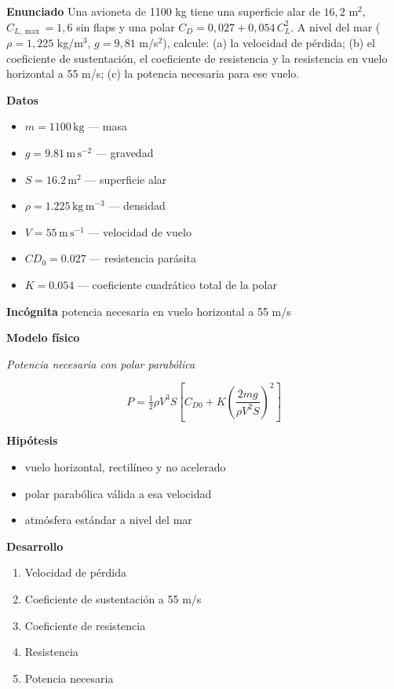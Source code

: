 \documentclass[10pt,openany]{book}
\begin{document}
\begin{tcolorbox}[title={Problema resuelto}, studiumworked, breakable]

\noindent\textbf{Enunciado}
Una avioneta de 1100 kg tiene una superficie alar de \(16{,}2\) m\(^2\), \(C_{L,\max} = 1{,}6\) sin flaps y una polar \(C_D = 0{,}027 + 0{,}054\,C_L^{2}\). A nivel del mar (\(\rho = 1{,}225\) kg/m\(^3\), \(g = 9{,}81\) m/s\(^2\)), calcule: (a) la velocidad de pérdida; (b) el coeficiente de sustentación, el coeficiente de resistencia y la resistencia en vuelo horizontal a 55 m/s; (c) la potencia necesaria para ese vuelo.

\noindent\textbf{Datos}
\begin{itemize}
\item $m = 1100\,\mathrm{kg}$ — masa
\item $g = 9.81\,\mathrm{m}\,\mathrm{s}^{-2}$ — gravedad
\item $S = 16.2\,\mathrm{m}^{2}$ — superficie alar
\item $\rho = 1.225\,\mathrm{kg}\,\mathrm{m}^{-3}$ — densidad
\item $V = 55\,\mathrm{m}\,\mathrm{s}^{-1}$ — velocidad de vuelo
\item $CD_{0} = 0.027$ — resistencia parásita
\item $K = 0.054$ — coeficiente cuadrático total de la polar
\end{itemize}

\noindent\textbf{Incógnita}
potencia necesaria en vuelo horizontal a 55 m/s

\noindent\textbf{Modelo físico}

\noindent\textit{Potencia necesaria con polar parabólica}

\[
P = \tfrac12\rho V^{3} S\left[C_{D0} + K\left(\frac{2 m g}{\rho V^{2} S}\right)^{2}\right]
\]

\noindent\textbf{Hipótesis}
\begin{itemize}
\item vuelo horizontal, rectilíneo y no acelerado
\item polar parabólica válida a esa velocidad
\item atmósfera estándar a nivel del mar
\end{itemize}

\noindent\textbf{Desarrollo}
\begin{enumerate}
\item
Velocidad de pérdida
\item
Coeficiente de sustentación a 55 m/s
\item
Coeficiente de resistencia
\item
Resistencia
\item
Potencia necesaria
\end{enumerate}


\end{tcolorbox}
\end{document}
